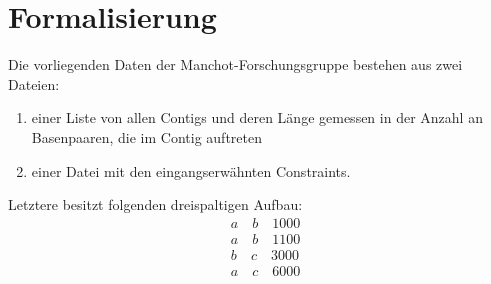 \newcommand{\sprache}{deutsch}

\newcommand{\arbeit}{Bachelorarbeit}




\setcounter{page}{1}




\section{Formalisierung}\raggedbottom 

Die vorliegenden Daten der Manchot-Forschungsgruppe bestehen aus zwei Dateien: 
\begin{enumerate}
\item einer Liste von allen Contigs und deren Länge gemessen in der Anzahl an Basenpaaren, die im Contig auftreten
\item einer Datei mit den eingangserwähnten Constraints.
\end{enumerate}
Letztere besitzt folgenden dreispaltigen Aufbau:
\begin{align*}
&a \quad b \quad 1000\\
&a \quad b \quad 1100\\
&b \quad c \quad 3000\\
&a \quad c \quad 6000
\end{align*}


